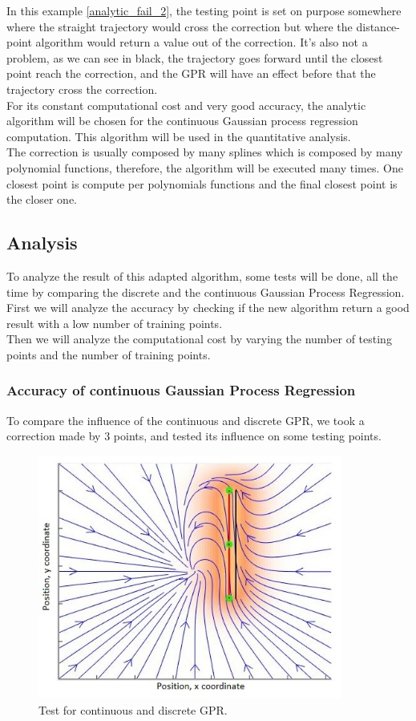 In this example \autoref{analytic_fail_2}, the testing point is set on purpose somewhere where the straight trajectory would cross the correction but where the distance-point algorithm would return a value out of the correction. It's also not a problem, as we can see in black, the trajectory goes forward until the closest point reach the correction, and the GPR will have an effect before that the trajectory cross the correction.\\

For its constant computational cost and very good accuracy, the analytic algorithm will be chosen for the continuous Gaussian process regression computation. This algorithm will be used in the quantitative analysis.\\

The correction is usually composed by many splines which is composed by many polynomial functions, therefore, the algorithm will be executed many times. One closest point is compute per polynomials functions and the final closest point is the closer one.

\clearpage
\subsection{Analysis}

To analyze the result of this adapted algorithm, some tests will be done, all the time by comparing the discrete and the continuous Gaussian Process Regression. \\
First we will analyze the accuracy by checking if the new algorithm return a good result with a low number of training points.\\
Then we will analyze the computational cost by varying the number of testing points and the number of training points.

\subsubsection{Accuracy of continuous Gaussian Process Regression}

To compare the influence of the continuous and discrete GPR, we took a correction made by 3 points, and tested its influence on some testing points.

\begin{figure}[H]
\centering
\includegraphics[width=10cm]{img/gp_test.JPG}
\caption{Test for continuous and discrete GPR.}
\label{quan_gpr_1}
\end{figure}

